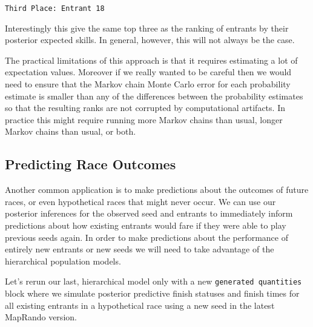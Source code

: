 \documentclass[
  letterpaper,
  DIV=11,
  numbers=noendperiod]{scrartcl}
\begin{document}
\begin{verbatim}
Third Place: Entrant 18
\end{verbatim}

Interestingly this give the same top three as the ranking of entrants by
their posterior expected skills. In general, however, this will not
always be the case.

The practical limitations of this approach is that it requires
estimating a lot of expectation values. Moreover if we really wanted to
be careful then we would need to ensure that the Markov chain Monte
Carlo error for each probability estimate is smaller than any of the
differences between the probability estimates so that the resulting
ranks are not corrupted by computational artifacts. In practice this
might require running more Markov chains than usual, longer Markov
chains than usual, or both.

\subsection{Predicting Race Outcomes}\label{predicting-race-outcomes}

Another common application is to make predictions about the outcomes of
future races, or even hypothetical races that might never occur. We can
use our posterior inferences for the observed seed and entrants to
immediately inform predictions about how existing entrants would fare if
they were able to play previous seeds again. In order to make
predictions about the performance of entirely new entrants or new seeds
we will need to take advantage of the hierarchical population models.

Let's rerun our last, hierarchical model only with a new
\texttt{generated\ quantities} block where we simulate posterior
predictive finish statuses and finish times for all existing entrants in
a hypothetical race using a new seed in the latest MapRando version.
\end{document}
